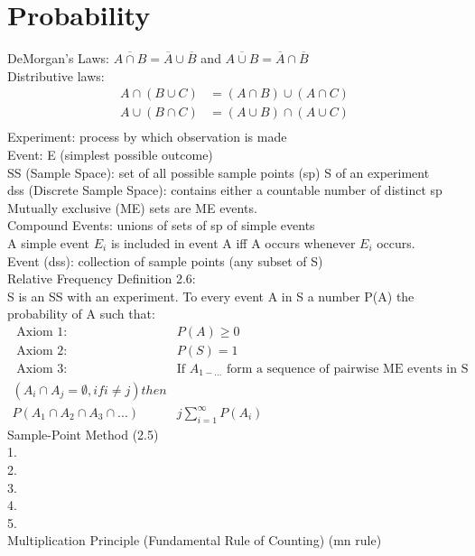 \documentclass[12pt]{article}
\newcommand{\uu}{\overline}
\begin{document}
\section{Probability}
	DeMorgan's Laws: $ \uu{A \cap B} = \uu{A} \cup \uu{B}   $ and
	$ \uu{A \cup B} = \uu{A} \cap \uu{B} $ \\
	Distributive laws:
	\begin{align*}
		A \cap (B \cup C) &= (A \cap B) \cup (A \cap C) \\
		A \cup (B \cap C) &= (A \cup B) \cap (A \cup C) \\
	\end{align*}
	Experiment: process by which observation is made \\
	Event: E (simplest possible outcome) \\
	SS (Sample Space): set of all possible sample points (sp) S of an experiment \\
	dss (Discrete Sample Space): contains either a countable number of distinct sp \\
	Mutually exclusive (ME) sets are ME events. \\
	Compound Events: unions of sets of sp of simple events \\
	A simple event $ E_i $ is included in event A iff A occurs whenever $ E_i $ occurs. \\
	Event (dss): collection of sample points (any subset of S) \\
	Relative Frequency Definition 2.6: \\
		S is an SS with an experiment. To every event A in S a number P(A)
		the probability of A such that:
		\begin{align*}
			\text{ Axiom 1: }& P(A) \ge 0 \\
			\text{ Axiom 2: }& P(S) = 1 \\
			\text{ Axiom 3: }& \text{If } A_{1-...} 
			\text{ form a sequence of pairwise ME events in S } \\
			(A_i \cap  A_j = \emptyset, if i \ne j) then \\
			P(A_1 \cap A_2 \cap A_3 \cap ...) &j \sum^{\infty}_{i=1}P(A_i)
		\end{align*}
	Sample-Point Method (2.5)\\
	1. \\
	2. \\
	3. \\
	4. \\
	5. \\
	Multiplication Principle (Fundamental Rule of Counting) (mn rule) \\
\end{document}
